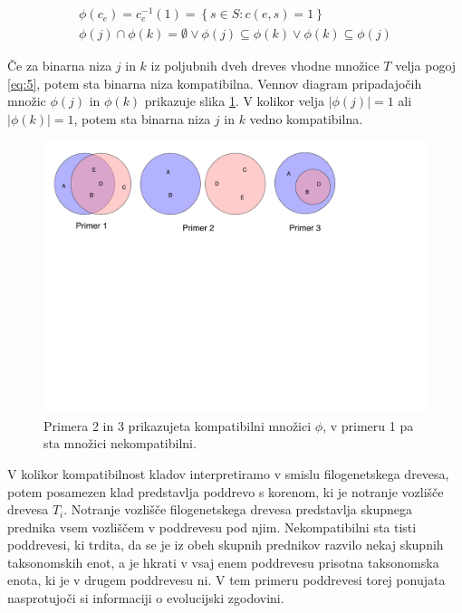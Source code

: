 \documentclass[a4paper, 12pt]{book}
\begin{document}
\begin{align}
	\phi(c_e) = c_e^{-1}(1) = \left\{ s \in S: c(e, s) = 1 \right\} \label{eq:4} \\
	\phi(j) \cap \phi(k) = \emptyset \lor \phi(j) \subseteq \phi(k) \lor \phi(k) \subseteq \phi(j) \label{eq:5}
\end{align} 

Če za binarna niza $j$ in $k$ iz poljubnih dveh dreves vhodne množice $T$ velja pogoj \ref{eq:5}, potem sta binarna niza kompatibilna. Vennov diagram pripadajočih množic $\phi(j)$ in $\phi(k)$ prikazuje slika \ref{img-venn-compatibility}. V kolikor velja $\left|\phi(j)\right| = 1$ ali $\left|\phi(k)\right| = 1$, potem sta binarna niza $j$ in $k$ vedno kompatibilna.   

\begin{figure}
	\begin{center}
		\includegraphics[scale=0.54, clip=true, trim=0 15cm 0 0]{gfx/venn-amt-compatibility.pdf}
	\end{center}
	\caption{Primera 2 in 3 prikazujeta kompatibilni množici $\phi$, v primeru 1 pa sta množici nekompatibilni.}
	\label{img-venn-compatibility}
\end{figure}

V kolikor kompatibilnost kladov interpretiramo v smislu filogenetskega drevesa, potem posamezen klad predstavlja poddrevo s korenom, ki je notranje vozlišče drevesa $T_i$. Notranje vozlišče filogenetskega drevesa predstavlja skupnega prednika vsem vozliščem v poddrevesu pod njim. Nekompatibilni sta tisti poddrevesi, ki trdita, da se je iz obeh skupnih prednikov razvilo nekaj skupnih taksonomskih enot, a je hkrati v vsaj enem poddrevesu prisotna taksonomska enota, ki je v drugem poddrevesu ni. V tem primeru poddrevesi torej ponujata nasprotujoči si informaciji o evolucijski zgodovini. 
\end{document}

